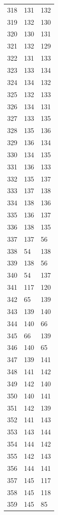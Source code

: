\documentclass[a4paper,11pt]{article}
\begin{document}
\begin{center}
\begin{longtable}{|R{1.5cm}|R{1.5cm}|R{1.5cm}|}
  318 &  131 &  132 \\
  319 &  132 &  130 \\
  320 &  130 &  131 \\
  321 &  132 &  129 \\
  322 &  131 &  133 \\
  323 &  133 &  134 \\
  324 &  134 &  132 \\
  325 &  132 &  133 \\
  326 &  134 &  131 \\
  327 &  133 &  135 \\
  328 &  135 &  136 \\
  329 &  136 &  134 \\
  330 &  134 &  135 \\
  331 &  136 &  133 \\
  332 &  135 &  137 \\
  333 &  137 &  138 \\
  334 &  138 &  136 \\
  335 &  136 &  137 \\
  336 &  138 &  135 \\
  337 &  137 &   56 \\
  338 &   54 &  138 \\
  339 &  138 &   56 \\
  340 &   54 &  137 \\
  341 &  117 &  120 \\
  342 &   65 &  139 \\
  343 &  139 &  140 \\
  344 &  140 &   66 \\
  345 &   66 &  139 \\
  346 &  140 &   65 \\
  347 &  139 &  141 \\
  348 &  141 &  142 \\
  349 &  142 &  140 \\
  350 &  140 &  141 \\
  351 &  142 &  139 \\
  352 &  141 &  143 \\
  353 &  143 &  144 \\
  354 &  144 &  142 \\
  355 &  142 &  143 \\
  356 &  144 &  141 \\
  357 &  145 &  117 \\
  358 &  145 &  118 \\
  359 &  145 &   85 \\

\end{longtable}
\end{center}
\end{document}
